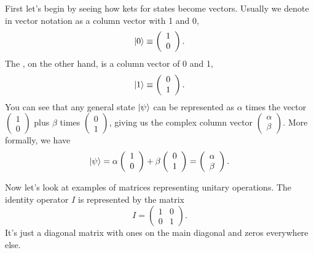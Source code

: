 First let's begin by seeing how kets for states become vectors. Usually we denote  in vector notation as a column vector with 1 and 0,
\begin{equation}
\left| 0 \right\rangle\equiv\left(\begin{array}{l}
1 \\
0
\end{array}\right).
\end{equation}
The , on the other hand, is a column vector of 0 and 1,
\begin{equation}
\left| 1 \right\rangle\equiv\left(\begin{array}{l}
0 \\
1
\end{array}\right).
\end{equation}
You can see that any general state $\left| \psi \right\rangle$ can be represented as $\alpha$ times the vector $\left(\begin{array}{l}
1 \\
0
\end{array}\right)$ plus $\beta$ times $\left(\begin{array}{l}
0 \\
1
\end{array}\right)$, giving us the complex column vector $\left(\begin{array}{l}
\alpha \\
\beta
\end{array}\right)$. More formally, we have
\begin{equation}
\left| \psi \right\rangle=\alpha\left(\begin{array}{l}
1 \\
0
\end{array}\right)+\beta\left(\begin{array}{l}
0 \\
1
\end{array}\right)=\left(\begin{array}{l}
\alpha \\
\beta
\end{array}\right).
\end{equation}


Now let's look at examples of matrices representing unitary operations. The identity operator $I$ is represented by the matrix
\begin{equation}
I=\left(\begin{array}{ll}
1 & 0 \\
0 & 1
\end{array}\right).
\end{equation}
It's just a diagonal matrix with ones on the main diagonal and zeros everywhere else.

